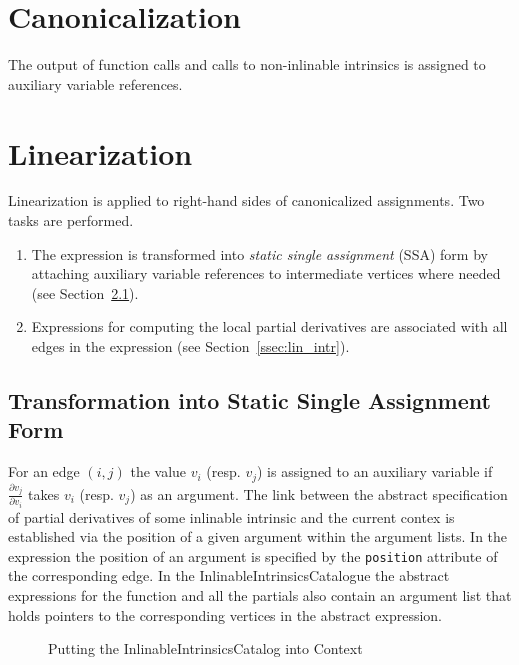 \documentclass{book}
\newcommand{\sect}[1]{Section~#1}
\begin{document}
\section{Canonicalization}

The output of function calls and calls to non-inlinable intrinsics
is assigned to auxiliary variable references.

\section{Linearization}
\label{sec:linearization}

Linearization is applied to right-hand sides of canonicalized 
assignments. Two tasks are performed.
\begin{enumerate}
\item The expression is transformed into {\em static single
assignment} (SSA) form by attaching auxiliary variable references
to intermediate vertices where needed (see \sect{\ref{ssec:ssa}}).
\item Expressions for computing the local partial derivatives are
associated with all edges in the expression (see \sect{\ref{ssec:lin_intr}}).
\end{enumerate}

\subsection{Transformation into Static Single Assignment Form}
\label{ssec:ssa}

For an edge $(i,j)$ the value $v_i$ (resp. $v_j$) is assigned to an 
auxiliary variable if $\frac{\partial v_j}{\partial v_i}$ takes
$v_i$ (resp. $v_j$) as an argument. The link between the
abstract specification of partial derivatives of some inlinable
intrinsic and the current contex is established via the position
of a given argument within the argument lists. In the expression
the position of an argument is specified by the
{\tt position} attribute of the corresponding edge.
In the InlinableIntrinsicsCatalogue the abstract expressions
for the function and all the partials also contain an argument list
that holds pointers to the corresponding vertices in the abstract
expression. 

\begin{figure}
\centering {}
\caption{Putting the InlinableIntrinsicsCatalog into Context}
\label{fig:catalogmap}
\end{figure}
\end{document}
